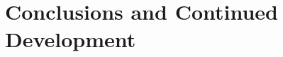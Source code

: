 \documentclass[conf]{new-aiaa}
\begin{document}






\FloatBarrier

\section{Conclusions and Continued Development}
\end{document}
